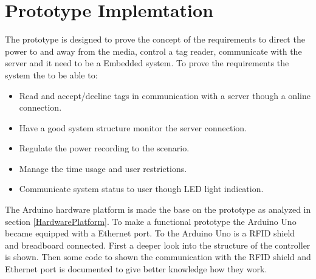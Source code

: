 \section{Prototype Implemtation}
The prototype is designed to prove the concept of the requirements to direct the power to and away from the media, control a tag reader, communicate with the server and it need to be a Embedded system. \newline
To prove the requirements the system the to be able to: 

\begin{itemize}
	\item Read and accept/decline tags in communication with a server though a online connection.
	\item Have a good system structure monitor the server connection.
	\item Regulate the power recording to the scenario.
	\item Manage the time usage and user restrictions. 
	\item Communicate system status to user though LED light indication. 
\end{itemize}

The Arduino hardware platform is made the base on the prototype as analyzed in section \ref{HardwarePlatform}.
To make a functional prototype the Arduino Uno became equipped with a Ethernet port. To the Arduino Uno is a RFID shield and breadboard connected.        
First a deeper look into the structure of the controller is shown. Then some code to shown the communication with the RFID shield and Ethernet port is documented to give better knowledge how they work.      


    